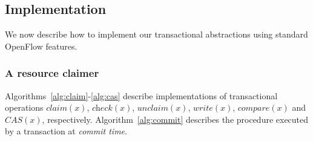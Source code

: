 \documentclass[conference]{sigcomm-alternate}
\newcommand{\cas}{CAS\xspace}
\newcommand{\claimcheck}{check\xspace}
\newcommand{\compare}{compare\xspace}
\newcommand{\liron}[1]{\textit{\textcolor{mygreen}{[liron]: #1}}} %
\begin{document}

\subsection{Implementation}\label{sec:t-impl}

We now describe how to implement our transactional
abstractions using standard OpenFlow features.


\subsubsection{A resource claimer}
Algorithms~\ref{alg:claim}-\ref{alg:cas} describe implementations of
transactional operations  $\textit{claim}(x)$, $\textit{\claimcheck}(x)$, $\textit{unclaim}(x)$, $\textit{write}(x)$,  $\textit{\compare}(x)$
and $\textit{\cas}(x)$, respectively.
Algorithm~\ref{alg:commit} describes the procedure executed by
a transaction at \emph{commit time}.
\end{document}
